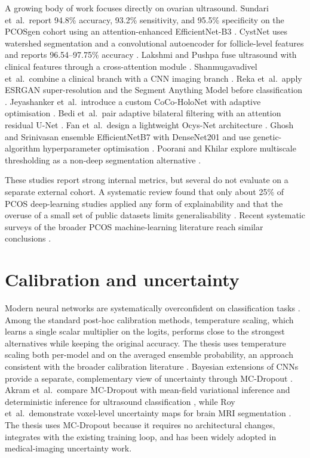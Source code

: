 \documentclass[../preamble.tex]{subfiles}
\begin{document}
A growing body of work focuses directly on ovarian ultrasound. Sundari
et~al.\ report 94.8\% accuracy, 93.2\% sensitivity, and 95.5\% specificity on
the PCOSgen cohort using an attention-enhanced EfficientNet-B3
\cite{sundari2025}. CystNet uses watershed segmentation and a convolutional
autoencoder for follicle-level features and reports 96.54--97.75\% accuracy
\cite{moral2024}. Lakshmi and Pushpa fuse ultrasound with clinical features
through a cross-attention module \cite{lakshmi2026}. Shanmugavadivel
et~al.\ combine a clinical branch with a CNN imaging branch
\cite{shanmugavadivel2024}. Reka et~al.\ apply ESRGAN super-resolution and
the Segment Anything Model before classification \cite{reka2025}.
Jeyashanker et~al.\ introduce a custom CoCo-HoloNet with adaptive
optimisation \cite{jeyashanker2025}. Bedi et~al.\ pair adaptive bilateral
filtering with an attention residual U-Net \cite{bedi2024}. Fan
et~al.\ design a lightweight Ocys-Net architecture \cite{fan2023}. Ghosh and
Srinivasan ensemble EfficientNetB7 with DenseNet201 and use genetic-algorithm
hyperparameter optimisation \cite{ghosh2025}. Poorani and Khilar explore
multiscale thresholding as a non-deep segmentation alternative
\cite{poorani2024}.

These studies report strong internal metrics, but several do not evaluate on
a separate external cohort. A systematic review found that only about 25\% of
PCOS deep-learning studies applied any form of explainability and that the
overuse of a small set of public datasets limits generalisability
\cite{ghaderzadeh2025}. Recent systematic surveys of the broader
PCOS machine-learning literature reach similar conclusions
\cite{suha2023,ghosh2025}.

\section{Calibration and uncertainty}
\label{sec:bg-calib-unc}

Modern neural networks are systematically overconfident on classification
tasks \cite{guo2017}. Among the standard post-hoc calibration methods,
temperature scaling, which learns a single scalar multiplier on the logits,
performs close to the strongest alternatives while keeping the original
accuracy. The thesis uses temperature scaling both per-model and on the
averaged ensemble probability, an approach consistent with the broader
calibration literature \cite{guo2017}. Bayesian extensions of CNNs provide a
separate, complementary view of uncertainty through MC-Dropout
\cite{gal2016}. Akram et~al.\ compare MC-Dropout with mean-field variational
inference and deterministic inference for ultrasound classification
\cite{akram2025}, while Roy et~al.\ demonstrate voxel-level uncertainty maps
for brain MRI segmentation \cite{roy2018}. The thesis uses MC-Dropout
because it requires no architectural changes, integrates with the existing
training loop, and has been widely adopted in medical-imaging uncertainty
work.
\end{document}
